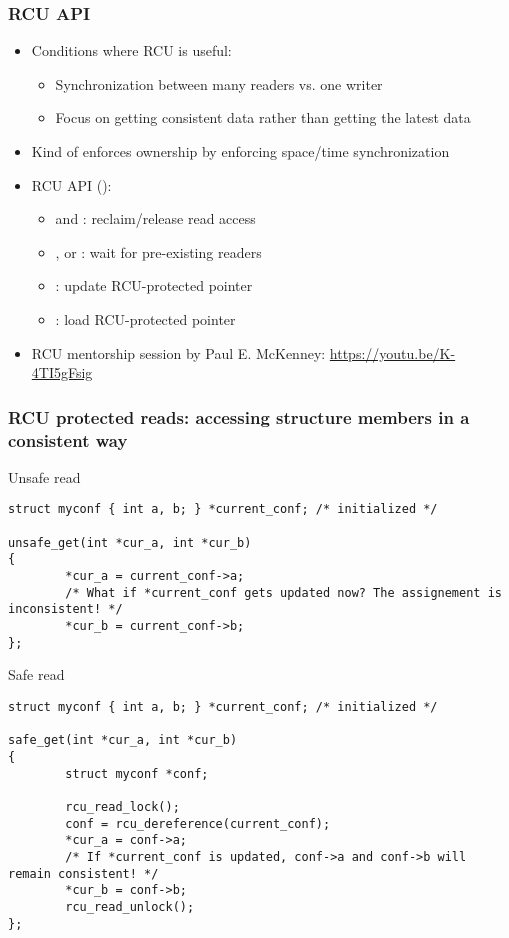 \begin{frame}[fragile]
  \frametitle{RCU API}
  \begin{itemize}
  \item Conditions where RCU is useful:
    \begin{itemize}
    \item Synchronization between many readers vs. one writer
    \item Focus on getting consistent data rather than getting the
      latest data
    \end{itemize}
  \item Kind of enforces ownership by enforcing space/time synchronization
  \item RCU API ():
    \begin{itemize}
    \item {} and :
      reclaim/release read access
    \item {},  or : wait for
      pre-existing readers
    \item {}: update RCU-protected pointer
    \item {}: load RCU-protected pointer
    \end{itemize}
  \item RCU mentorship session by Paul E. McKenney:
    \url{https://youtu.be/K-4TI5gFsig}
  \end{itemize}
\end{frame}

\begin{frame}[fragile]
  \frametitle{RCU protected reads: accessing structure members in a consistent way}
    \begin{block}{Unsafe read}
      \begin{verbatim}
struct myconf { int a, b; } *current_conf; /* initialized */

unsafe_get(int *cur_a, int *cur_b)
{
        *cur_a = current_conf->a;
        /* What if *current_conf gets updated now? The assignement is inconsistent! */
        *cur_b = current_conf->b;
};
      \end{verbatim}
    \end{block}
  \begin{block}{Safe read}
    \begin{verbatim}
struct myconf { int a, b; } *current_conf; /* initialized */

safe_get(int *cur_a, int *cur_b)
{
        struct myconf *conf;

        rcu_read_lock();
        conf = rcu_dereference(current_conf);
        *cur_a = conf->a;
        /* If *current_conf is updated, conf->a and conf->b will remain consistent! */
        *cur_b = conf->b;
        rcu_read_unlock();
};
    \end{verbatim}
  \end{block}
\end{frame}

